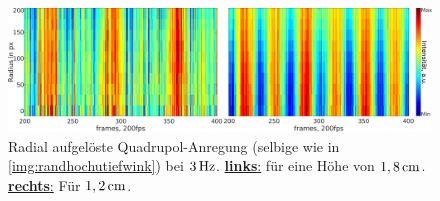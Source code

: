 \documentclass[numbers=noenddot,a4paper,notitlepage,twoside,BCOR15mm]{scrbook}
\newcommand{\fett}[1]{\textbf{#1}}
\begin{document}
				\begin{figure}[!b]
					\centering
					\includegraphics[width=\textwidth,height=0.38\textwidth]{figs/auswertung/plasmaglw/randhochutiefquad3Hz1sekrad.png}
					\caption{Radial aufgelöste Quadrupol-Anregung (selbige wie in \ref{img:randhochutiefwink}) bei $\unit[3]{Hz}$. \underline{\fett{links}:} für eine Höhe von $\unit[1,8]{cm}$. \underline{\fett{rechts}:} Für $\unit[1,2]{cm}$.}
					\label{img:randhochutiefrad}
				\end{figure}
\end{document}
